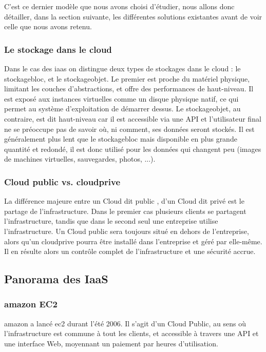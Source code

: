 \documentclass[a4paper,oneside]{report}
\begin{document}
C'est ce dernier modèle que nous avons choisi d'étudier, nous allons donc détailler, dans la section suivante, les différentes solutions existantes avant de voir celle que nous avons retenu.

\subsubsection{Le stockage dans le cloud}
Dans le cas des \gls{iaas} on distingue deux types de stockages dans le cloud : le \gls{stockagebloc}, et le \gls{stockageobjet}.
Le premier est proche du matériel physique, limitant les couches d'abstractions, et offre des performances de haut-niveau.
Il est exposé aux instances virtuelles comme un disque physique natif, ce qui permet au système d'exploitation de démarrer dessus.\newline
Le \gls{stockageobjet}, au contraire, est dit \og haut-niveau \fg car il est accessible via une API et l'utilisateur final ne se préoccupe pas de savoir où, ni comment, ses données seront stockés.
Il est généralement plus lent que le \gls{stockagebloc} mais disponible en plus grande quantité et redondé, il est donc utilisé pour les données qui changent peu (images de machines virtuelles, sauvegardes, photos, ...).

\subsubsection{Cloud public vs. \gls{cloudprive}}
La différence majeure entre un Cloud dit \og public \fg, d'un Cloud dit \og privé \fg est le partage de l'infrastructure.
Dans le premier cas plusieurs clients se partagent l'infrastructure, tandis que dans le second seul une entreprise utilise l'infrastructure.\newline
Un Cloud public sera toujours situé en dehors de l'entreprise, alors qu'un \gls{cloudprive} pourra être installé dans l'entreprise et géré par elle-même.
Il en résulte alors un contrôle complet de l'infrastructure et une sécurité accrue.

\subsection{Panorama des IaaS}
\subsubsection{\gls{amazon} EC2}
\gls{amazon} a lancé \gls{ec2} durant l'été 2006.
Il s'agit d'un Cloud Public, au sens où l'infrastructure est commune à tout les clients, et accessible à travers une API et une interface Web, moyennant un paiement par heures d'utilisation.
\end{document}
